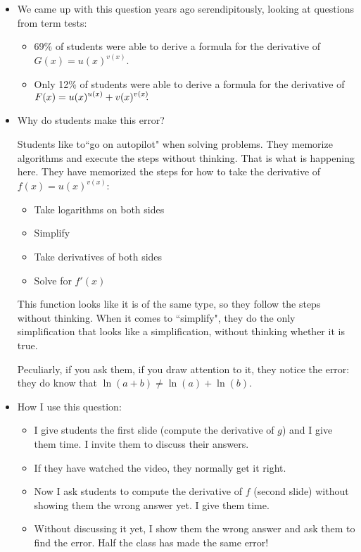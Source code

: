 \documentclass[11pt]{article}
\newcommand {\DS} [1] {${\displaystyle #1}$}
\newcommand{\nl}{\hfill \vspace{-1.1\baselineskip}} %
\begin{document}
\vspace{-5mm}
\begin{comments}
\nl
\begin{itemize}
	\item We came up with this question years ago serendipitously, looking at questions from term tests:
		\begin{itemize}
			\item    \hspace{-2.5mm}  69\% of students were able to derive a formula for the derivative of \DS{G(x) = u(x)^{v(x)}}.
			\item  \hspace{-2.5mm} Only 12\% of students were able to derive a formula for the derivative of {\DS{F(x)=u(x)^{u(x)} + v(x)^{v(x)} \hspace{-1mm}.}}
		\end{itemize}
	\item Why do students make this error?
		
		Students like to``go on autopilot" when solving problems.  They memorize algorithms and execute the steps without thinking.  That is what is happening here.  They have memorized the steps for how to take the derivative of \DS{f(x)= u(x)^{v(x)}}:
			\begin{itemize}
				\item Take logarithms on both sides
				\item Simplify
				\item Take derivatives of both sides
				\item Solve for \DS{f'(x)}
			\end{itemize}
		This function looks like it is of the same type, so they follow the steps without thinking.  When it comes to ``simplify", they do the only simplification that looks like a simplification, without thinking whether it is true.
		
		Peculiarly, if you ask them, if you draw attention to it, they notice the error:  they do know that \DS{\ln(a+b) \neq \ln(a) + \ln(b)}.

	\item How I use this question:	
		\begin{itemize}
			\item  I give students the first slide (compute the derivative of $g$) and I give them time.  I invite them to discuss their answers.
			\item If they have watched the video, they normally get it right.
			\item Now I ask students to compute the derivative of $f$ (second slide) without showing them the wrong answer yet.  I give them time.
			\item Without discussing it yet, I show them the wrong answer and ask them to find the error.   Half the class has made the same error!
		\end{itemize}

\end{itemize}	
\end{comments}
\end{document}
